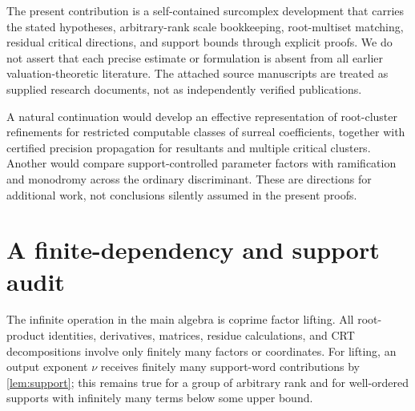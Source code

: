 \documentclass[11pt,letterpaper]{article}
\numberwithin{equation}{section}
\theoremstyle{definition}
\theoremstyle{remark}\newtheorem{remark}[theorem]{Remark}
\begin{document}
The present contribution is a self-contained surcomplex development
that carries the stated hypotheses, arbitrary-rank scale bookkeeping,
root-multiset matching, residual critical directions, and support bounds
through explicit proofs. We do not assert that each precise estimate
or formulation is absent from all earlier valuation-theoretic
literature. The attached source manuscripts are treated as supplied
research documents, not as independently verified publications.

A natural continuation would develop an effective representation of
root-cluster refinements for restricted computable classes of surreal
coefficients, together with certified precision propagation for
resultants and multiple critical clusters. Another would compare
support-controlled parameter factors with ramification and monodromy
across the ordinary discriminant. These are directions for additional
work, not conclusions silently assumed in the present proofs.

\appendix
\section{A finite-dependency and support audit}\label{app:support}
The infinite operation in the main algebra is coprime factor lifting.
All root-product identities, derivatives, matrices, residue calculations,
and CRT decompositions involve only finitely many factors or coordinates.
For lifting, an output exponent $\nu$ receives finitely many support-word
contributions by \cref{lem:support}; this remains true for a group of
arbitrary rank and for well-ordered supports with infinitely many terms
below some upper bound.
\end{document}
